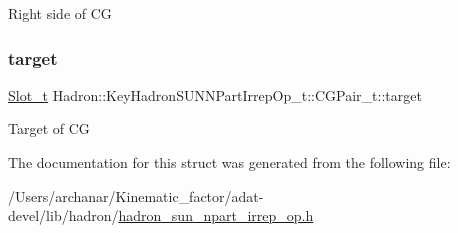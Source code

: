 Right side of CG \mbox{\label{structHadron_1_1KeyHadronSUNNPartIrrepOp__t_1_1CGPair__t_ab6dffdb3cf72e5c38d9a27cda160ba9c}} 
\subsubsection{\texorpdfstring{target}{target}}
{\footnotesize\ttfamily \mbox{\hyperlink{structHadron_1_1KeyHadronSUNNPartIrrepOp__t_1_1CGPair__t_1_1Slot__t}{Slot\+\_\+t}} Hadron\+::\+Key\+Hadron\+S\+U\+N\+N\+Part\+Irrep\+Op\+\_\+t\+::\+C\+G\+Pair\+\_\+t\+::target}

Target of CG 

The documentation for this struct was generated from the following file\+:\begin{DoxyCompactItemize}
\item 
/\+Users/archanar/\+Kinematic\+\_\+factor/adat-\/devel/lib/hadron/\mbox{\hyperlink{adat-devel_2lib_2hadron_2hadron__sun__npart__irrep__op_8h}{hadron\+\_\+sun\+\_\+npart\+\_\+irrep\+\_\+op.\+h}}\end{DoxyCompactItemize}
